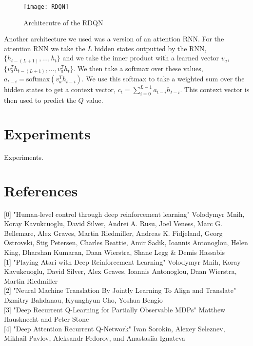 \documentclass{article}
\begin{document}
\begin{figure}[h]
    \centering
    \texttt{[image: RDQN]}
    \caption{Architecutre of the RDQN}
\end{figure}

Another architecture we used was a version of an attention RNN. For the attention
RNN we take the $L$ hidden states outputted by the RNN, $\{h_{t-(L+1)}, \dots, h_{t}\}$
and we take the inner product with a learned vector $v_a$, $\{v_a^Th_{t-(L+1)}, \dots,
v_a^Th_{t}\}$. We then take a softmax over these values, $a_{t-i} =
\text{softmax}(v_a^Th_{t-i})$. We use this softmax to take a weighted sum over
the hidden states to get a context vector, $c_t = \sum_{i=0}^{L-1}a_{t-i}h_{t-i}$.
This context vector is then used to predict the $Q$ value.

\section{Experiments}
Experiments.

\section*{References}
\small
[0] "Human-level control through deep reinforcement learning" Volodymyr Mnih, Koray Kavukcuoglu, David Silver, Andrei A. Rusu, Joel Veness, Marc G. Bellemare, Alex Graves, Martin Riedmiller, Andreas K. Fidjeland, Georg Ostrovski, Stig Petersen, Charles Beattie, Amir Sadik, Ioannis Antonoglou, Helen King, Dharshan Kumaran, Daan Wierstra, Shane Legg \& Demis Hassabis \\

[1] "Playing Atari with Deep Reinforcement Learning" Volodymyr Mnih, Koray Kavukcuoglu, David Silver, Alex Graves, Ioannis Antonoglou, Daan Wierstra, Martin Riedmiller \\

[2] "Neural Machine Translation By Jointly Learning To Align and Translate" Dzmitry Bahdanau, Kyunghyun Cho, Yoshua Bengio \\

[3] "Deep Recurrent Q-Learning for Partially Observable MDPs" Matthew Hausknecht and Peter Stone \\

[4] "Deep Attention Recurrent Q-Network" Ivan Sorokin, Alexey Seleznev, Mikhail Pavlov, Aleksandr Fedorov, and Anastasiia Ignateva \\
\end{document}
